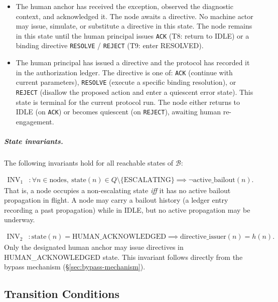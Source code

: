 \begin{itemize}
\item[\textbf{HUMAN\_ACKNOWLEDGED.}] The human anchor has received the exception, observed the diagnostic context, and acknowledged it. The node awaits a directive. No machine actor may issue, simulate, or substitute a directive in this state. The node remains in this state until the human principal issues \texttt{ACK} (T8: return to IDLE) or a binding directive \texttt{RESOLVE} / \texttt{REJECT} (T9: enter RESOLVED).

\item[\textbf{RESOLVED.}] The human principal has issued a directive and the protocol has recorded it in the authorization ledger. The directive is one of: \texttt{ACK} (continue with current parameters), \texttt{RESOLVE} (execute a specific binding resolution), or \texttt{REJECT} (disallow the proposed action and enter a quiescent error state). This state is terminal for the current protocol run. The node either returns to IDLE (on \texttt{ACK}) or becomes quiescent (on \texttt{REJECT}), awaiting human re-engagement.
\end{itemize}

\subparagraph{State invariants.} The following invariants hold for all reachable states of $\mathcal{B}$:

\begin{align}
\text{INV}_1 &: \forall n \in \text{nodes},\ \text{state}(n) \in Q \setminus \{\text{ESCALATING}\} \implies \neg\text{active\_bailout}(n). \tag{INV-1}
\end{align}
That is, a node occupies a non-escalating state \emph{iff} it has no active bailout propagation in flight. A node may carry a bailout history (a ledger entry recording a past propagation) while in IDLE, but no active propagation may be underway.

\begin{align}
\text{INV}_2 &: \text{state}(n) = \text{HUMAN\_ACKNOWLEDGED} \implies \text{directive\_issuer}(n) = h(n). \tag{INV-2}
\end{align}
Only the designated human anchor may issue directives in HUMAN\_ACKNOWLEDGED state. This invariant follows directly from the bypass mechanism (\S\ref{sec:bypass-mechanism}).

\subsection{Transition Conditions}\label{sec:transition-conditions}

